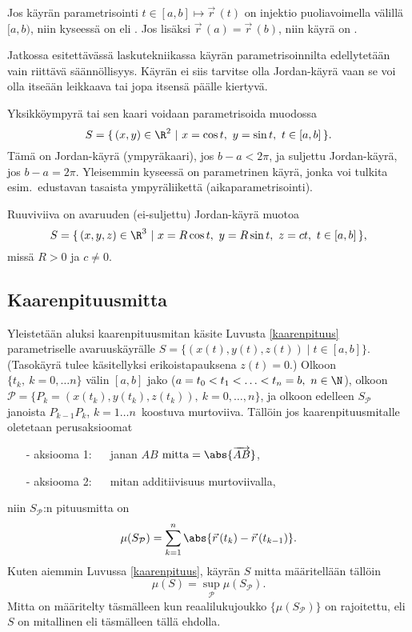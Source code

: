 Jos käyrän parametrisointi $t\in[a,b]\mapsto\vec r\,(t)$ on injektio puoliavoimella välillä
$[a,b)$, niin kyseessä on  eli . Jos lisäksi
$\vec r\,(a)=\vec r\,(b)$, niin käyrä on .
\begin{figure}[H]
\begin{center}

\end{center}
\end{figure}
Jatkossa esitettävässä laskutekniikassa käyrän parametrisoinnilta edellytetään vain riittävä
säännöllisyys. Käyrän ei siis tarvitse olla Jordan-käyrä vaan se voi olla itseään leikkaava tai
jopa itsensä päälle kiertyvä.
\begin{Exa}
Yksikköympyrä tai sen kaari voidaan parametrisoida muodossa
\[
S=\{\,(x,y)\in\R^2 \ | \ x=\cos t, \ y=\sin t, \ t\in [a,b]\,\}.
\]
Tämä on Jordan-käyrä (ympyräkaari), jos $b-a<2\pi$, ja suljettu Jordan-käyrä, jos $b-a=2\pi$.
Yleisemmin kyseessä on parametrinen käyrä, jonka voi tulkita esim.\ edustavan tasaista
ympyräliikettä (aikaparametrisointi). \loppu
\end{Exa}
\begin{Exa} Ruuviviiva on avaruuden (ei-suljettu) Jordan-käyrä muotoa
\[
S=\{\,(x,y,z)\in\R^3 \ | \ x=R\cos t, \ y=R\sin t, \ z=ct, \ t\in [a,b]\,\},
\]
missä $R>0$ ja $c \neq 0$. \loppu
\end{Exa}

\subsection{Kaarenpituusmitta}

Yleistetään aluksi kaarenpituusmitan käsite Luvusta \ref{kaarenpituus} parametriselle 
avaruuskäyrälle $S = \{(x(t),y(t),z(t)) \mid t \in [a,b]\}$. (Tasokäyrä tulee käsitellyksi
erikoistapauksena $z(t)=0$.) Olkoon $\{t_k, \ k=0,\ldots n\}$ välin $[a,b]$ jako 
($a=t_0<t_1<\ldots<t_n=b,\ n\in\N$), olkoon 
$\mathcal{P}=\{P_k=(x(t_k),y(t_k),z(t_k)),\ k=0,\ldots,n\}$, ja olkoon edelleen 
$S_{\mathcal{P}}$ janoista $P_{k-1}P_k$, $k=1\ldots n\,$ koostuva murtoviiva. Tällöin jos
kaarenpituusmitalle oletetaan perusaksioomat
\begin{itemize}
\item[-] aksiooma 1: $\quad$ janan $AB$ $\text{mitta}=\abs{\overrightarrow{AB}}$,
\item[-] aksiooma 2: $\quad$ mitan additiivisuus murtoviivalla,
\end{itemize}
niin $S_{\mathcal{P}}$:n pituusmitta on
\[
\mu(S_{\mathcal{P}})=\sum_{k=1}^n\abs{\vec r\,(t_k)-\vec r\,(t_{k-1})}.
\]
Kuten aiemmin Luvussa \ref{kaarenpituus}, käyrän $S$ mitta määritellään tällöin
\[
\mu(S)=\sup_{\mathcal{P}} \mu(S_{\mathcal{P}}).
\]
Mitta on määritelty täsmälleen kun reaalilukujoukko $\{\mu(S_{\mathcal{P}})\}$ on rajoitettu,
%
eli $S$ on mitallinen eli  täsmälleen tällä ehdolla.

